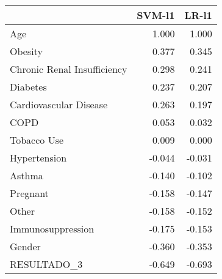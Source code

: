 \begin{tabular}{lrr}
\toprule
{} &  SVM-l1 &  LR-l1 \\
\midrule
Age                         &   1.000 &  1.000 \\
Obesity                     &   0.377 &  0.345 \\
Chronic Renal Insufficiency &   0.298 &  0.241 \\
Diabetes                    &   0.237 &  0.207 \\
Cardiovascular Disease      &   0.263 &  0.197 \\
COPD                        &   0.053 &  0.032 \\
Tobacco Use                 &   0.009 &  0.000 \\
Hypertension                &  -0.044 & -0.031 \\
Asthma                      &  -0.140 & -0.102 \\
Pregnant                    &  -0.158 & -0.147 \\
Other                       &  -0.158 & -0.152 \\
Immunosuppression           &  -0.175 & -0.153 \\
Gender                      &  -0.360 & -0.353 \\
RESULTADO\_3                 &  -0.649 & -0.693 \\
\bottomrule
\end{tabular}
